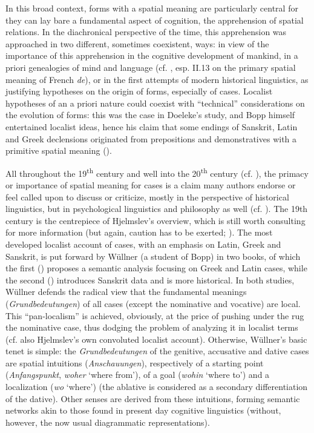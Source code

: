 \documentclass[english,output=paper,colorlinks,citecolor=brown]{../langscibook}
\begin{document}
In this broad context, forms with a spatial meaning are particularly central for they can lay bare a fundamental aspect of cognition, the apprehension of spatial relations. In the diachronical perspective of the time, this apprehension was approached in two different, sometimes coexistent, ways: in view of the importance of this apprehension in the cognitive development of mankind, in a priori genealogies of mind and language (cf. \citealt{Condillac1775}, esp. II.13 on the primary spatial meaning of French \textit{de}), or in the first attempts of modern historical linguistics, as justifying hypotheses on the origin of forms, especially of cases. Localist hypotheses of an a priori nature could coexist with “technical” considerations on the evolution of forms: this was the case in Doeleke’s study, and Bopp himself entertained localist ideas, hence his claim that some endings of Sanskrit, Latin and Greek declensions originated from prepositions and demonstratives with a primitive spatial meaning (\citeyear{Bopp1826}).

All throughout the 19\textsuperscript{th} century and well into the 20\textsuperscript{th} century (cf. \citealt{Kurylowicz1964}), the primacy or importance of spatial meaning for cases is a claim many authors endorse or feel called upon to discuss or criticize, mostly in the perspective of historical linguistics, but in psychological linguistics and philosophy as well (cf. \citealt{Marty1910}). The 19th century is the centrepiece of Hjelmslev’s overview, which is still worth consulting for more information (but again, caution has to be exerted; \citealt{Fortis2018Anderson}). The most developed localist account of cases, with an emphasis on Latin, Greek and Sanskrit, is put forward by Wüllner (a student of Bopp) in two books, of which the first (\citealt{Wüllner1827}) proposes a semantic analysis focusing on Greek and Latin cases, while the second (\citeyear{Wüllner1831}) introduces Sanskrit data and is more historical. In both studies, Wüllner defends the radical view that the fundamental meanings (\textit{Grundbedeutungen}) of all cases (except the nominative and vocative) are local. This “pan-localism” is achieved, obviously, at the price of pushing under the rug the nominative case, thus dodging the problem of analyzing it in localist terms (cf. also Hjelmslev’s own convoluted localist account). Otherwise, Wüllner’s basic tenet is simple: the \textit{Grundbedeutungen} of the genitive, accusative and dative cases are spatial intuitions (\textit{Anschauungen}), respectively of a starting point (\textit{Anfangspunkt}, \textit{woher }‘where from’), of a goal (\textit{wohin }‘where to’) and a localization (\textit{wo }‘where’) (the ablative is considered as a secondary differentiation of the dative). Other senses are derived from these intuitions, forming semantic networks akin to those found in present day cognitive linguistics (without, however, the now usual diagrammatic representations).
\end{document}
